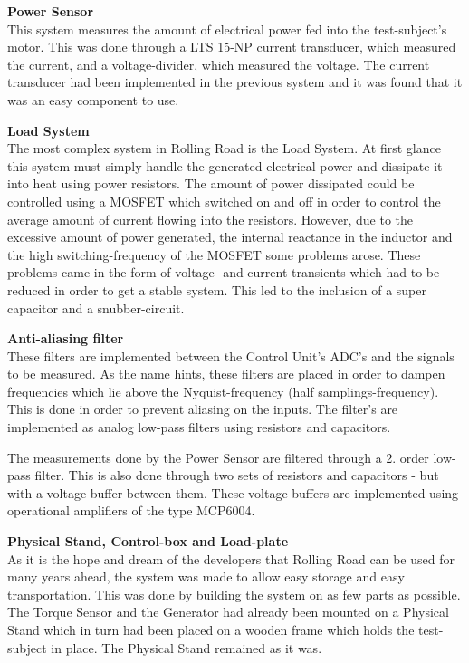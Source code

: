 \textbf{Power Sensor}\\
This system measures the amount of electrical power fed into the test-subject's motor. This was done through a LTS 15-NP current transducer\cite{CurrentTransducer}, which measured the current, and a voltage-divider, which measured the voltage. The current transducer had been implemented in the previous system and it was found that it was an easy component to use.

\textbf{Load System}\\ 
The most complex system in Rolling Road is the Load System. At first glance this system must simply handle the generated electrical power and dissipate it into heat using power resistors\cite{PowerResistor}. The amount of power dissipated could be controlled using a MOSFET\cite{IRFP260N} which switched on and off in order to control the average amount of current flowing into the resistors. However, due to the excessive amount of power generated, the internal reactance in the inductor and the high switching-frequency of the MOSFET some problems arose. These problems came in the form of voltage- and current-transients which had to be reduced in order to get a stable system. This led to the inclusion of a super capacitor\cite{SuperCapacitor} and a snubber-circuit\cite{Snubber}.

\textbf{Anti-aliasing filter}\\
These filters are implemented between the Control Unit's ADC's and the signals to be measured. As the name hints, these filters are placed in order to dampen frequencies which lie above the Nyquist-frequency (half samplings-frequency). This is done in order to prevent aliasing on the inputs. The filter's are implemented as analog low-pass filters using resistors and capacitors. 

The measurements done by the Power Sensor are filtered through a 2. order low-pass filter. This is also done through two sets of resistors and capacitors - but with a voltage-buffer between them. These voltage-buffers are implemented using operational amplifiers of the type MCP6004\cite{MCP6004}.

\textbf{Physical Stand, Control-box and Load-plate}\\
As it is the hope and dream of the developers that Rolling Road can be used for many years ahead, the system was made to allow easy storage and easy transportation. This was done by building the system on as few parts as possible. The Torque Sensor and the Generator had already been mounted on a Physical Stand which in turn had been placed on a wooden frame which holds the test-subject in place. The Physical Stand remained as it was.

